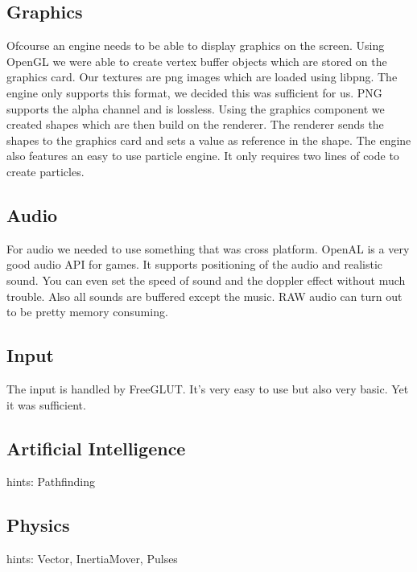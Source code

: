 \documentclass[acmtoplas,acmnow]{acmtrans2m}
\begin{document}
\subsection{Graphics}
Ofcourse an engine needs to be able to display graphics on the screen. Using OpenGL we were able to create vertex buffer objects which are stored on the graphics card. Our textures are png images which are loaded using libpng. The engine only supports this format, we decided this was sufficient for us. PNG supports the alpha channel and is lossless. Using the graphics component we created shapes which are then build on the renderer. The renderer sends the shapes to the graphics card and sets a value as reference in the shape. The engine also features an easy to use particle engine. It only requires two lines of code to create particles.

\subsection{Audio}
For audio we needed to use something that was cross platform. OpenAL is a very good audio API for games. It supports positioning of the audio and realistic sound. You can even set the speed of sound and the doppler effect without much trouble. Also all sounds are buffered except the music. RAW audio can turn out to be pretty memory consuming.

\subsection{Input}
The input is handled by FreeGLUT. It's very easy to use but also very basic. Yet it was sufficient.

\subsection{Artificial Intelligence}
hints: Pathfinding

\subsection{Physics}
hints: Vector, InertiaMover, Pulses

\begin{thebibliography}{}

\end{thebibliography}

\begin{received}
\end{received}
\end{document}
